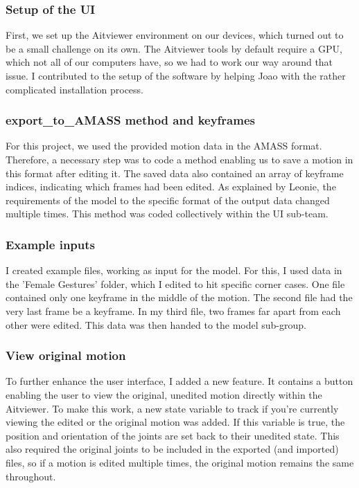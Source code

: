 \documentclass[a4paper]{scrartcl}
\begin{document}
\subsubsection*{Setup of the UI}  
First, we set up the Aitviewer environment on our devices, which turned out to be a small challenge on its own. The Aitviewer tools by default require a GPU, which not all of our computers have, so we had to work our way around that issue. I contributed to the setup of the software by helping Joao with the rather complicated installation process.

\subsubsection*{export\_to\_AMASS method and keyframes}
For this project, we used the provided motion data in the AMASS format. Therefore, a necessary step was to code a method enabling us to save a motion in this format after editing it. The saved data also contained an array of keyframe indices, indicating which frames had been edited. As explained by Leonie, the requirements of the model to the specific format of the output data changed multiple times. This method was coded collectively within the UI sub-team.  

\subsubsection*{Example inputs}
I created example files, working as input for the model. For this, I used data in the 'Female Gestures' folder, which I edited to hit specific corner cases. One file contained only one keyframe in the middle of the motion. The second file had the very last frame be a keyframe. In my third file, two frames far apart from each other were edited. This data was then handed to the model sub-group.

\subsubsection*{View original motion}
To further enhance the user interface, I added a new feature. It contains a button enabling the user to view the original, unedited motion directly within the Aitviewer. To make this work, a new state variable to track if you're currently viewing the edited or the original motion was added. If this variable is true, the position and orientation of the joints are set back to their unedited state. This also required the original joints to be included in the exported (and imported) files, so if a motion is edited multiple times, the original motion remains the same throughout.
\end{document}
